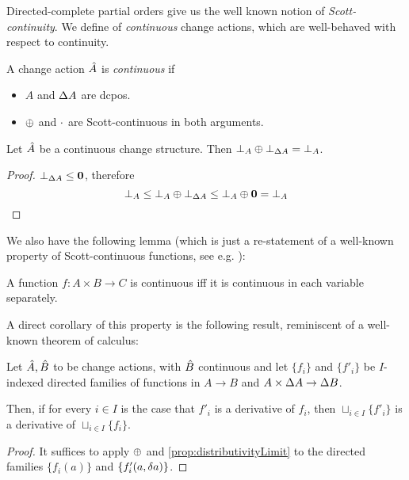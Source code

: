 Directed-complete partial orders give us the well known notion of
\textit{Scott-continuity}. We define of \textit{continuous} change actions,
which are well-behaved with respect to continuity.

\begin{defn}
  A change action $\hat{A}$ is \textit{continuous} if
  \begin{itemize}
    \item $A$ and $\Delta A$ are dcpos.
    \item $\oplus$ and $\cdot$ are Scott-continuous in both arguments.
  \end{itemize}
\end{defn}

\begin{corollary}
  \label{cor:bottomPlusBottom}
  Let $\hat{A}$ be a continuous change structure. Then $\bot_A \oplus
  \bot_{\Delta A} = \bot_A$.
\end{corollary}
\ifproofs
\begin{proof}
  $\bot_{\Delta A} \leq \textbf{0}$, therefore
  $$\bot_A \leq \bot_A \oplus \bot_{\Delta A} \leq \bot_A \oplus \textbf{0} = \bot_A$$
\end{proof}
\fi

We also have the following lemma (which is just a re-statement of a well-known
property of Scott-continuous functions, see e.g. \cite[Lemma~3.2.6]{abramsky1994domain}):

\begin{prop}
  \label{prop:distributivityLimit}
  A function $f : A \times B \rightarrow C$ is continuous iff it is continuous in each variable separately.
\end{prop}

A direct corollary of this property is the following result, reminiscent of a well-known theorem of calculus:

\begin{corollary}
  \label{cor:diffContinuous}
  Let $\hat{A}, \hat{B}$ to be change actions, with $\hat{B}$ continuous and let $\{f_i\}$ and $\{f'_i\}$ be
  $I$-indexed directed families of functions in $A \rightarrow B$ and $A \times \Delta A \rightarrow \Delta B$.

  Then, if for every $i \in I$ is the case that $f'_i$ is a derivative of $f_i$, then $\sqcup_{i \in I} \{ f'_i \}$ is
  a derivative of $\sqcup_{i \in I} \{ f_i \}$.
\end{corollary}
\ifproofs
\begin{proof}
  It suffices to apply $\oplus$ and \cref{prop:distributivityLimit} to the directed families $\{ f_i(a) \}$ and 
  $\{ f_i'(a, \delta a) \}$.
\end{proof}
\fi

